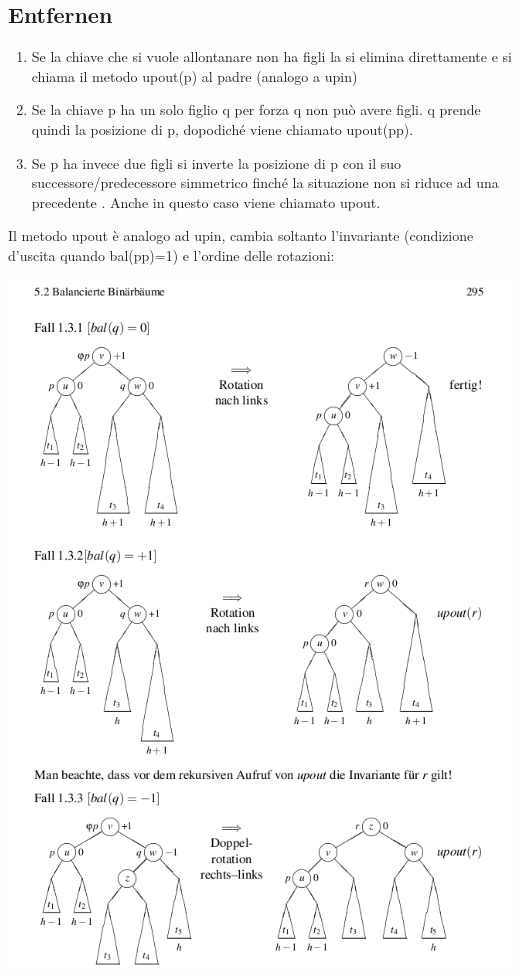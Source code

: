 \documentclass[a4paper]{book}
\begin{document}
\subsection*{Entfernen}
\begin{enumerate}
\item Se la chiave che si vuole allontanare non ha figli la si elimina direttamente e si chiama il metodo upout(p) al padre (analogo a upin)
\item Se la chiave p ha un solo figlio q per forza q non può avere figli. q prende quindi la posizione di p, dopodiché viene chiamato upout(pp).
\item Se p ha invece due figli si inverte la posizione di p con il suo successore/predecessore simmetrico finché la situazione non si riduce ad una precedente . Anche in questo caso viene chiamato upout.
\end{enumerate}
Il metodo upout è analogo ad upin, cambia soltanto l'invariante (condizione d'uscita quando bal(pp)=1) e l'ordine delle rotazioni:
\begin{center}
\includegraphics[scale=0.5]{Figures/avldeletion.png}
\end{center}
\end{document}
